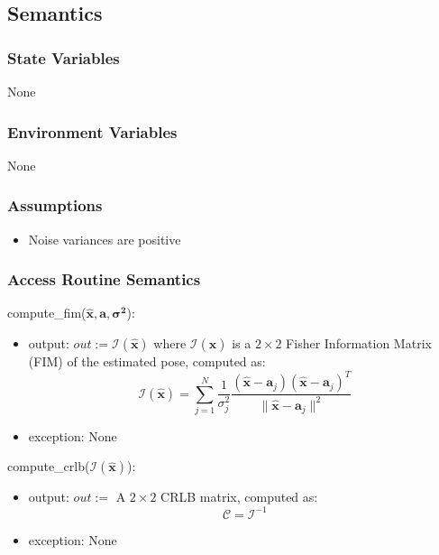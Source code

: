 \documentclass[12pt, titlepage]{article}
\begin{document}
\subsection{Semantics}

\subsubsection{State Variables}
None

\subsubsection{Environment Variables}
None

\subsubsection{Assumptions}
\begin{itemize}
  \item Noise variances are positive
\end{itemize}

\subsubsection{Access Routine Semantics}

\noindent compute\_fim($\hat{\mathbf{x}}, \mathbf{a}, \boldsymbol{\sigma^2}$):
\begin{itemize}
\item output: $out:=\boldsymbol{\mathcal{I}}(\hat{\mathbf{x}})$ where $\boldsymbol{\mathcal{I}}(\hat{\mathbf{x}})$ is a \( 2 \times 2 \) Fisher Information Matrix (FIM) of the estimated pose, computed as:
\[
\mathcal{I}(\hat{\mathbf{x}}) = \sum_{j=1}^{N} \frac{1}{\sigma_j^2} \frac{(\hat{\mathbf{x}} - \mathbf{a}_j)(\hat{\mathbf{x}} - \mathbf{a}_j)^T}{\|\hat{\mathbf{x}} - \mathbf{a}_j\|^2}
\]
\item exception: None
\end{itemize}

\noindent compute\_crlb($\boldsymbol{\mathcal{I}}(\hat{\mathbf{x}})$):
\begin{itemize}
\item output: $out:=$ A \( 2 \times 2 \) CRLB matrix, computed as:
\[
\boldsymbol{\mathcal{C}} = \boldsymbol{\mathcal{I}}^{-1}
\]
\item exception: None
\end{itemize}
\end{document}
